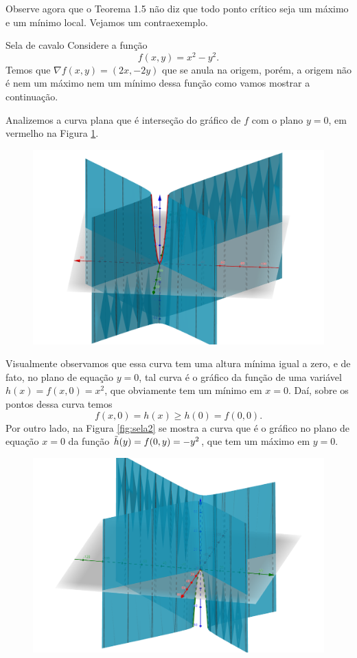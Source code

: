 Observe agora que o Teorema 1.5 não diz que todo ponto crítico seja um máximo e um mínimo local. Vejamos um contraexemplo. 
\begin{example}{Sela de cavalo}{}
Considere a função    
\begin{equation}\label{eq:sela}
f(x,y)=x^2-y^2.
\end{equation}
Temos que $\nabla f(x,y)=(2x,-2y)$ que se anula na origem, porém, a origem não é nem um máximo nem um mínimo dessa função como vamos mostrar a continuação. 

Analizemos a curva plana que é interseção do gráfico de $f$ com o plano $y=0$, em vermelho na Figura \ref{fig:sela1}. 
\begin{figure}[H]
    \centering
    \includegraphics[scale=0.25]{Figuras/Semana11/sela1}
    \caption{}
    \label{fig:sela1}
\end{figure}
Visualmente observamos que essa curva tem uma altura mínima igual a zero, e de fato, no plano de equação $y=0$, tal curva é o gráfico da função de uma variável $h(x)=f(x,0)=x^2$, que obviamente tem um mínimo em $x=0$. Daí, sobre os pontos dessa curva temos
\begin{equation}
    f(x,0)=h(x)\geq h(0)=f(0,0).
    \label{eq:sela1}
\end{equation}
Por outro lado, na Figura \ref{fig:sela2} se mostra a curva que é o gráfico no plano de equação $x=0$ da função $\Tilde{h}(y)=f(0,y)=-y^2$, que tem um máximo em  $y=0$. 
\begin{figure}[H]
    \centering
    \includegraphics[scale=0.25]{Figuras/Semana11/sela2}

\end{figure}
\end{example}
